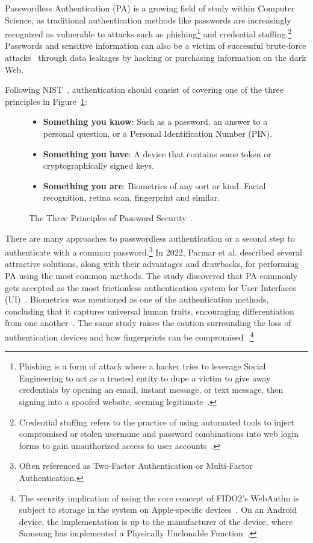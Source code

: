 Passwordless Authentication (PA) is a growing field of study within Computer
Science, as traditional authentication methods like passwords are increasingly
recognized as vulnerable to attacks such as phishing\footnote{
  Phishing is a form of attack where a hacker tries to leverage Social
  Engineering to act as a trusted entity to dupe a victim to give away
  credentials by opening an email, instant message, or text message, then
  signing into a spoofed website, seeming legitimate~\cite{ripa2021emergence}.
} and credential stuffing.\footnote{
  Credential stuffing refers to the practice of using automated tools to
  inject compromised or stolen username and password combinations into web login
  forms to gain unauthorized access to user accounts~\cite{owasp-credential-stuffing}.
}
Passwords and sensitive information can also be a victim of successful
brute-force attacks~\cite{bonneau2012science} through data leakages by hacking
or purchasing information on the dark Web.

Following NIST~\cite{NIST:SP:800-171r2, NISTSP800-63-3}, authentication should
consist of covering one of the three principles in
Figure~\ref{fig:secprinciples}:

\begin{figure}[htbp]
  \begin{itemize}
    \item \textbf{Something you know}:
    Such as a password, an answer to a personal question, or a Personal
    Identification Number (PIN).
    \item \textbf{Something you have}:
    A device that contains some token or cryptographically signed keys.
    \item \textbf{Something you are}:
    Biometrics of any sort or kind.
    Facial recognition, retina scan, fingerprint and similar.
  \end{itemize}
  \caption{The Three Principles of Password Security~\cite{schneier2000secrets, NIST:SP:800-171r2}.}
  \label{fig:secprinciples}
\end{figure}

There are many approaches to passwordless authentication or a second
step to authenticate with a common password.\footnote{
  Often referenced as Two-Factor Authentication or Multi-Factor Authentication.
}
In 2022, Parmar et al.\cite{parmar2022} described several attractive solutions, along with their advantages and drawbacks, for performing PA using the most common methods.
The study discovered that PA commonly gets accepted as the most frictionless authentication system for User Interfaces (UI)~\cite{parmar2022}.
Biometrics was mentioned as one of the authentication methods, concluding that it captures universal human traits, encouraging differentiation from one another~\cite{parmar2022}.
The same study raises the caution surrounding the loss of authentication devices and how fingerprints can be compromised~\cite{parmar2022}.\footnote{
  The security implication of using the core concept of FIDO2's WebAuthn is subject to storage in the system on Apple-specific devices~\cite{appleSecureEnclave}.
  On an Android device, the implementation is up to the manufacturer of the device, where Samsung has implemented a Physically Unclonable
  Function~\cite{lee2021samsung}.
}

